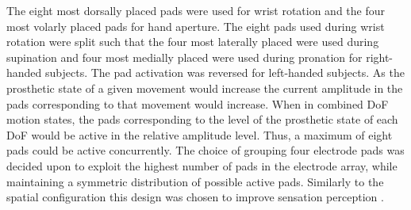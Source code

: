 The eight most dorsally placed pads were used for wrist rotation and the four most volarly placed pads for hand aperture. The eight pads used during wrist rotation were split such that the four most laterally placed were used during supination and four most medially placed were used during pronation for right-handed subjects. The pad activation was reversed for left-handed subjects. As the prosthetic state of a given movement would increase the current amplitude in the pads corresponding to that movement would increase. When in combined DoF motion states, the pads corresponding to the level of the prosthetic state of each DoF would be active in the relative amplitude level. Thus, a maximum of eight pads could be active concurrently. The choice of grouping four electrode pads was decided upon to exploit the highest number of pads in the electrode array, while maintaining a symmetric distribution of possible active pads. Similarly to the spatial configuration this design was chosen to improve sensation perception \cite{Dosen2015}.


